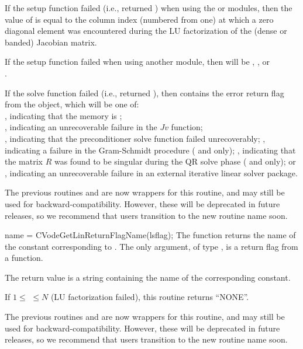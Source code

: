 {
  If the {\cvls} setup function failed (i.e.,  returned
  ) when using the {\sunlinsoldense} or
  {\sunlinsolband} modules, then the value of  is equal to
  the column index (numbered from one) at which a zero diagonal
  element was encountered during the LU factorization of the (dense or
  banded) Jacobian matrix.

  If the {\cvls} setup function failed when using another {\sunlinsol}
  module, then  will be ,
  , or \\ \noindent {}.

  If the {\cvls} solve function failed (i.e.,  returned
  ), then  contains the error return
  flag from the {\sunlinsol} object, which will be one of:\\ \noindent
  , indicating that the {\sunlinsol} memory is ;
  \\ \noindent {}, indicating an unrecoverable failure in the
  $Jv$ function;\\ \noindent
  , indicating that the preconditioner solve
  function  failed unrecoverably;
  , indicating a failure in the Gram-Schmidt
  procedure ({\spgmr} and {\spfgmr} only);
  , indicating that the matrix $R$ was found to be
  singular during the QR solve phase ({\spgmr} and {\spfgmr} only); or
  , indicating an unrecoverable
  failure in an external iterative linear solver package.

  The previous routines  and
   are now wrappers for this routine, and may
  still be used for backward-compatibility.  However, these will be
  deprecated in future releases, so we recommend that users transition
  to the new routine name soon.
}
{
  name = CVodeGetLinReturnFlagName(lsflag);
}
{
  The function  returns the
  name of the {\cvls} constant corresponding to .
}
{
  The only argument, of type , is a return flag from a {\cvls}
  function.
}
{
  The return value is a string containing the name of the corresponding constant.

  If $1 \leq $  $ \leq N$ (LU factorization failed), this routine
  returns ``NONE''.
}
{
  The previous routines  and
   are now wrappers for this routine, and may
  still be used for backward-compatibility.  However, these will be
  deprecated in future releases, so we recommend that users transition
  to the new routine name soon.
}




